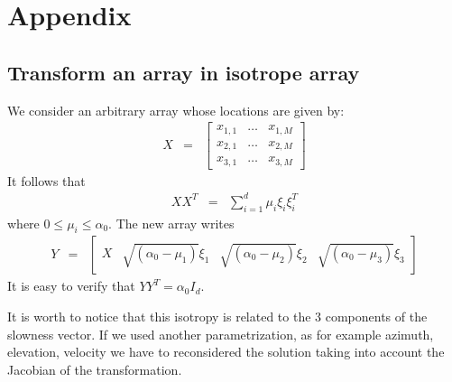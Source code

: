 \documentclass[a4paper, 12pt]{report}
\begin{document}
\chapter{Appendix}
\section{Transform an array in isotrope array}
We consider an arbitrary  array whose locations are given by:
\begin{eqnarray*}
X&=&\begin{bmatrix}
x_{1,1}&\ldots&x_{1,M}
\\
x_{2,1}&\ldots&x_{2,M}
\\
x_{3,1}&\ldots&x_{3,M}
\end{bmatrix}
\end{eqnarray*}
It follows that
\begin{eqnarray*}
 XX^{T}&=&
 \sum_{i=1}^{d}\mu_{i}\xi_{i}\xi^{T}_{i}
\end{eqnarray*}
where $0\leq \mu_{i}\leq \alpha_{0}$. The new array writes
\begin{eqnarray*}
Y &=& \begin{bmatrix}
X&\sqrt{(\alpha_{0}-\mu_{1})}\xi_{1}&\sqrt{(\alpha_{0}-\mu_{2})}\xi_{2}&\sqrt{(\alpha_{0}-\mu_{3})}\xi_{3}
\end{bmatrix}
\end{eqnarray*}
It is easy to verify that $YY^{T}=\alpha_{0}I_{d}$.

It is worth to notice that this isotropy is related to the 3 components of the slowness vector. If we used another parametrization, as for example azimuth, elevation, velocity we have to reconsidered the solution taking into account the Jacobian of the transformation.

\end{document}
